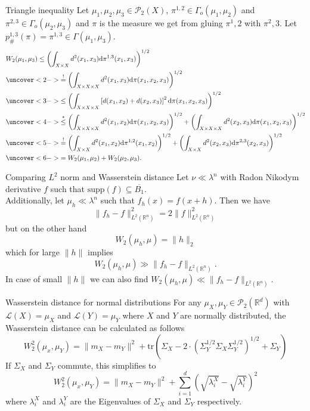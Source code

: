 \documentclass[10pt]{beamer}
\theoremstyle{reminder}
\begin{document}
\begin{frame}{Triangle inequality}
    Let $\mu_1,\mu_2,\mu_3 \in \mathcal{P}_2(X)$, $\pi^{1,2} \in \Gamma_o(\mu_1,\mu_2)$ and $\pi^{2,3} \in \Gamma_o(\mu_2,\mu_3)$ and 
    $\pi$ is the measure we get from gluing $\pi^1,2$ with $\pi^2,3$. Let $p^{1,3}_{\#}(\pi) = \pi^{1,3} \in \Gamma(\mu_1,\mu_3).$ 
    \begin{align*}&W_2(\mu_1,\mu_3) 
        \leq\left(\int_{X\times X}d^2(x_1,x_3)\mathrm{d}\pi^{1,3}(x_1,x_3)\right)^{1/2} 
        \\&\uncover<2->{\overset{!}{=}\left(\int_{X\times X\times X}d^2(x_1,x_3)\mathrm{d}\pi(x_1,x_2,x_3)\right)^{1/2}}
        \\&\uncover<3->{\leq \left(\int_{ X\times X\times X}\left[d(x_1,x_2)+d(x_2,x_3)\right]^2\mathrm{d}\pi(x_1,x_2,x_3)\right)^{1/2}}
        \\&\uncover<4->{\overset{*}{\leq}\left(\int_{X\times X \times X}d^2(x_1,x_2)\mathrm{d}\pi(x_1,x_2,x_3)\right)^{1/2}+\left(\int_{X\times X\times X}d^2(x_2,x_3)\mathrm{d}\pi(x_1,x_2,x_3)\right)^{1/2}}
        \\&\uncover<5->{\overset{!}{=}\left(\int_{X\times X}d^2(x_1,x_2)\mathrm{d}\pi^{1,2}(x_1,x_2)\right)^{1/2}+\left(\int_{X\times X}d^2(x_2,x_3)\mathrm{d}\pi^{2,3}(x_2,x_3)\right)^{1/2}}
        \\&\uncover<6->{=W_2(\mu_1,\mu_2)+W_2(\mu_2,\mu_3)}.
      \end{align*}
\end{frame}



\begin{frame}{Comparing $L^2$ norm and Wasserstein distance}
    Let $\nu \ll \lambda^n$ with Radon Nikodym derivative $f$ such that $\text{supp}(f) \subseteq \overline{B_1}$. \\ 
    \vspace{0.5cm}
        Additionally, let $\mu_h \ll \lambda^n$ such that $f_h(x) = f(x+h)$. Then we have $$\|f_h-f\|^2_{L^2(\mathbb{R}^n)} = 2\|f\|_{L^2(\mathbb{R}^n)}^2$$ but on the other hand $$W_2(\mu_h,\mu) = \|h\|_2$$ which for large $\|h\|$ implies $$W_2(\mu_h,\mu) \gg \|f_h-f\|_{L^2(\mathbb{R}^n)}.$$ In case of small $\|h\|$ we can also find $W_2(\mu_h,\mu) \ll \|f_h-f\|_{L^2(\mathbb{R}^n)}$.
\end{frame}

\begin{frame}{Wasserstein distance for normal distributions}
    For any $\mu_X,\mu_Y \in \mathcal{P}_2(\mathbb{R}^d)$ with $\mathcal{L}(X) = \mu_X$ and $\mathcal{L}(Y) = \mu_Y$ where $X$ and $Y$ are normally distributed, 
    the Wasserstein distance can be calculated as follows $$W_2^2(\mu_x,\mu_Y) = \|m_X-m_Y\|^2 + \text{tr}\left(\Sigma_X-2 \cdot \left(\Sigma_Y^{1/2}\Sigma_X\Sigma_Y^{1/2}\right)^{1/2}+\Sigma_Y\right)$$
    If $\Sigma_X$ and $\Sigma_Y$ commute, this simplifies to $$W_2^2(\mu_x,\mu_Y) = \|m_X-m_Y\|^2 + \sum_{i = 1}^d \left( \sqrt{\lambda_i^X} - \sqrt{\lambda_i^Y}  \right)^2$$
    where $\lambda_i^X$ and $\lambda_i^Y$ are the Eigenvalues of $\Sigma_X$ and $\Sigma_Y$ respectively. 
\end{frame}
\end{document}
